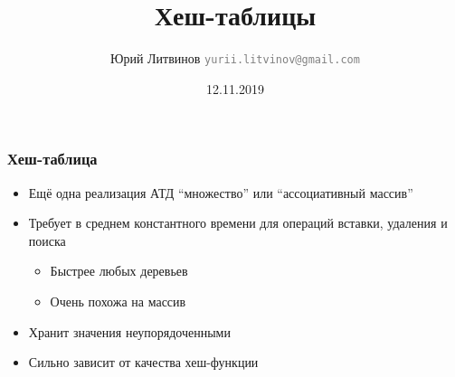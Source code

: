 \documentclass[xetex,mathserif,serif]{beamer}
\title{Хеш-таблицы}
\author[Юрий Литвинов]{Юрий Литвинов \newline \textcolor{gray}{\small\texttt{yurii.litvinov@gmail.com}}}
\date{12.11.2019}
\begin{document}
	
	\frame{\titlepage}

	\begin{frame}
		\frametitle{Хеш-таблица}
		\begin{itemize}
			\item Ещё одна реализация АТД ``множество'' или ``ассоциативный массив''
			\item Требует в среднем константного времени для операций вставки, удаления и поиска
			\begin{itemize}
				\item Быстрее любых деревьев
				\item Очень похожа на массив
			\end{itemize}
			\item Хранит значения неупорядоченными
			\item Сильно зависит от качества хеш-функции
		\end{itemize}
	\end{frame}
\end{document}
